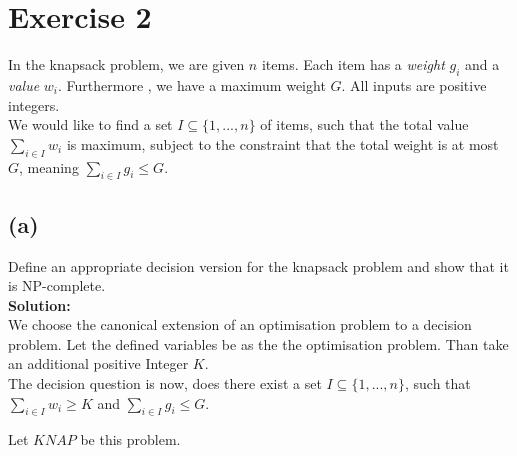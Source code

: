 \section*{Exercise 2}

In the knapsack problem, we are given $n$ items. Each item has a \emph{weight} $g_i$ and a \emph{value} $w_i$.
Furthermore , we have a maximum weight $G$. All inputs are positive integers.\\

We would like to find a set $I \subseteq \{ 1,...,n \}$ of items, such that the total value
$\underset{i \in I}{\sum} w_i$ is maximum, subject to the constraint that the total weight is at most
$G$, meaning $\underset{i \in I}{\sum} g_i \leq G$.

\subsection*{(a)} 

Define an appropriate decision version for the knapsack problem and show that it is NP-complete.\\

\textbf{Solution:}\\
We choose the canonical extension of an optimisation problem to a decision problem. Let the defined variables
be as the the optimisation problem. Than take an additional positive Integer $K$.\\

The decision question is now, does there exist a set $I \subseteq \{ 1, ... , n \}$, such that
$\underset{i \in I}{\sum} w_i \geq K$ and $\underset{ i \in I}{\sum} g_i \leq G$.

Let $KNAP$ be this problem.

\pagebreak

